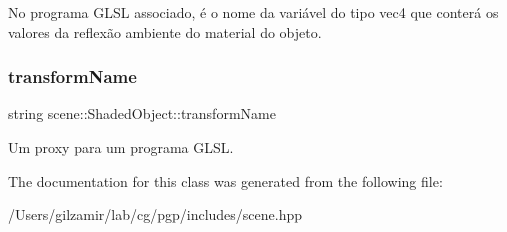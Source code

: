 No programa G\+L\+SL associado, é o nome da variável do tipo vec4 que conterá os valores da reflexão ambiente do material do objeto. \mbox{\label{classscene_1_1_shaded_object_a68adf6e1c31e6065c7a66e4959e147fe}} 
\subsubsection{\texorpdfstring{transform\+Name}{transformName}}
{\footnotesize\ttfamily string scene\+::\+Shaded\+Object\+::transform\+Name}

Um proxy para um programa G\+L\+SL. 

The documentation for this class was generated from the following file\+:\begin{DoxyCompactItemize}
\item 
/\+Users/gilzamir/lab/cg/pgp/includes/scene.\+hpp\end{DoxyCompactItemize}
